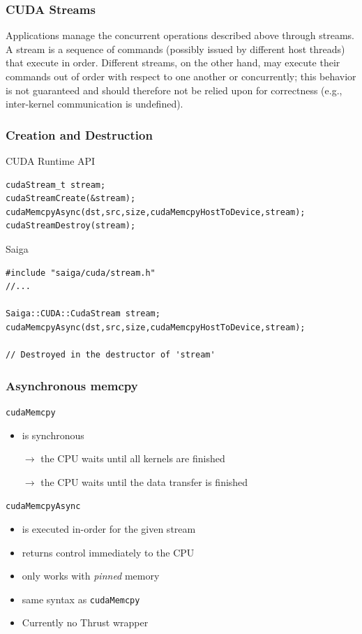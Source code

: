\documentclass[aspectratio=169,handout]{beamer}
\begin{document}
\begin{frame}[fragile]
\frametitle{CUDA Streams}
	\begin{mdframed}[frametitle={CUDA Programming Guide}]
Applications manage the concurrent operations described above through streams. A stream is a sequence of commands (possibly issued by different host threads) that execute in order. Different streams, on the other hand, may execute their commands out of order with respect to one another or concurrently; this behavior is not guaranteed and should therefore not be relied upon for correctness (e.g., inter-kernel communication is undefined). 
\end{mdframed}
\end{frame}

\begin{frame}[fragile]
\frametitle{Creation and Destruction}

CUDA Runtime API
\begin{lstlisting}
cudaStream_t stream;
cudaStreamCreate(&stream);
cudaMemcpyAsync(dst,src,size,cudaMemcpyHostToDevice,stream);
cudaStreamDestroy(stream);
\end{lstlisting}

Saiga
\begin{lstlisting}
#include "saiga/cuda/stream.h"
//...

Saiga::CUDA::CudaStream stream;
cudaMemcpyAsync(dst,src,size,cudaMemcpyHostToDevice,stream);

// Destroyed in the destructor of 'stream'
\end{lstlisting}
\end{frame}

\begin{frame}[fragile]
\frametitle{Asynchronous memcpy}
\texttt{cudaMemcpy}
\begin{itemize}
	\item is synchronous
	\item[$\rightarrow$] the CPU waits until all kernels are finished
	\item[$\rightarrow$] the CPU waits until the data transfer is finished
\end{itemize}
\texttt{cudaMemcpyAsync}
\begin{itemize}
	\item<2-> is executed in-order for the given stream
	\item<3-> returns control immediately to the CPU
	\item<4-> only works with \textit{pinned} memory
	\item<5-> same syntax as \texttt{cudaMemcpy}
	\item<6-> Currently no Thrust wrapper
\end{itemize}
\end{frame}
\end{document}
